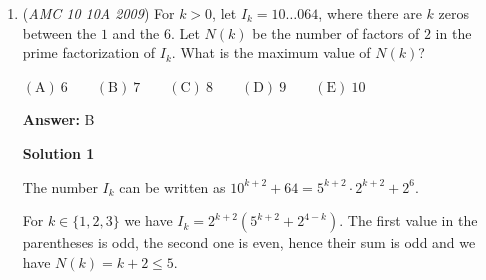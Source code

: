 \begin{enumerate}
 Case $3$ \textbf{None of them are adjacent}: In this scenario, the three vertices will have one vertex surrounded. That very vertex might be any one of the 8 vertices on the cube, which leads to $8$ cases.

 As there're $\binom{8}{3}=56$ overall cases and only cases 2 and 3 meet the enquirement, due to the classical probabilities, the probability is $\frac{24+8}{56} = \boxed{\frac{4}{7}}$




\textbf{Solution 6 (Casework)}

This problem is fairly simple. Start with $2$ points WLOG. 

 Case $1$: You pick 2 points that are diagonally across from each other but still on the same face. This happens with probability $\frac {3}{7}$. We notice that $4$ out of the $6$ possible outcomes include a point inside the cube. Therefore, the probability of this happening is $\frac {2}{7}$.

 Case $2$: You pick 2 points that a directly across from each other. This happens with probability $\frac {3}{7}$. We notice that $2$ out of the $6$ possible outcomes include a point inside the cube. Therefore, the probability of this happening is $\frac {1}{7}$.

 Case $3$: You pick 2 points that is a space diagonal of the cube. This happens with probability $\frac {1}{7}$. Clearly, all of the points contain a point inside the cube, so our probability is $\frac {1}{7}$. 

 Adding these probabilities gives us $\boxed {\frac {4}{7}}$



	\item (\textit{AMC 10 10A 2009}) For $k > 0$, let $I_k = 10\ldots 064$, where there are $k$ zeros between the $1$ and the $6$.  Let $N(k)$ be the number of factors of $2$ in the prime factorization of $I_k$.  What is the maximum value of $N(k)$?


 $\mathrm{(A)}\ 6 \qquad \mathrm{(B)}\ 7 \qquad \mathrm{(C)}\ 8 \qquad \mathrm{(D)}\ 9 \qquad \mathrm{(E)}\ 10$

 \textbf{Answer: }B



\textbf{Solution 1}

The number $I_k$ can be written as $10^{k+2} + 64 = 5^{k+2}\cdot 2^{k+2} + 2^6$.

 For $k\in\{1,2,3\}$ we have $I_k = 2^{k+2} \left( 5^{k+2} + 2^{4-k} \right)$. The first value in the parentheses is odd, the second one is even, hence their sum is odd and we have $N(k)=k+2\leq 5$.


\end{enumerate}
